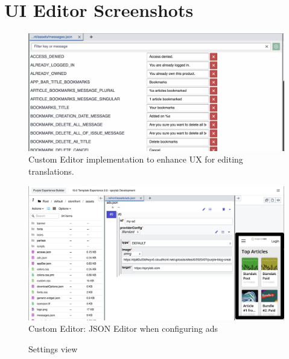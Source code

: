 \chapter{UI Editor Screenshots}
\label{app:screenshots}

\begin{figure}[h!]
  \includegraphics[width=\textwidth]{pics/messages_editor.jpg}
  \caption{Custom Editor implementation to enhance UX for editing translations.}
  \label{fig:messages_editor}
\end{figure}
\begin{figure}[h!]
  \includegraphics[width=\textwidth]{pics/ads_json_editor.jpg}
  \caption{Custom Editor: JSON Editor when configuring ads}
  \label{fig:ads-editor}
\end{figure}
\begin{figure}[h!]
  \caption{Settings view}
  \label{fig:settings}
\end{figure}